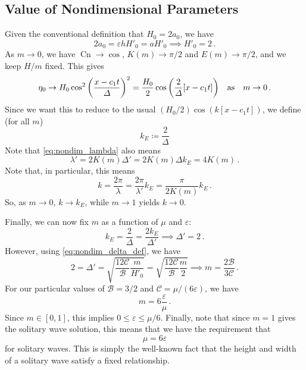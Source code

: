 \documentclass{jfm}
\let\Oldsubsection\subsection
\renewcommand{\subsection}{\FloatBarrier\Oldsubsection}
\DeclareMathOperator{\cn}{Cn}
\renewcommand*{\epsilon}{\varepsilon}
\begin{document}
\subsection{Value of Nondimensional Parameters}
Given the conventional definition that $H_0 = 2 a_0$, we have
\begin{equation}
  2 a_0 = \epsilon h H'_0 = a H'_0 \implies H'_0 = 2 \,.
\end{equation}
As $m \to 0$, we have $\cn \to \cos$, $K(m) \to \pi/2$ and $E(m) \to
\pi/2$, and we keep $H/m$ fixed.
This gives
\begin{equation}
  \eta_0 \to H_0 \cos^2 \pqty{\frac{x-c_1 t}{\Delta}}^2
  = \frac{H_0}{2} \cos \pqty{\frac{2}{\Delta} \bqty{x-c_1 t}}
  \qq{as} m \to 0 \,.
\end{equation}
Since we want this to reduce to the usual $(H_0/2) \cos(k[x-c_1 t])$, we
define (for all $m$)
\begin{equation}
  k_E \coloneqq \frac{2}{\Delta}
\end{equation}
Note that \cref{eq:nondim_lambda} also means
\begin{equation}
  \lambda' = 2 K(m) \Delta' = 2 K(m) \Delta k_E = 4 K(m) \,.
\end{equation}
Note that, in particular, this means
\begin{equation}
  k = \frac{2 \pi}{\lambda} = \frac{2 \pi}{\lambda'} k_E
  = \frac{\pi}{2 K(m)} k_E \,.
\end{equation}
So, as $m \to 0$, $k \to k_E$, while $m \to 1$ yields $k \to 0$.

Finally, we can now fix $m$ as a function of $\mu$ and $\epsilon$:
\begin{equation}
  k_E = \frac{2}{\Delta} = \frac{2 k_E}{\Delta'}
  \implies \Delta' = 2 \,.
\end{equation}
However, using \cref{eq:nondim_delta_def}, we have
\begin{equation}
  2 = \Delta ' = \sqrt{\frac{12 \mathcal{C}}{\mathcal{B}}
    \frac{m}{H'_0}}
  = \sqrt{\frac{12 \mathcal{C}}{\mathcal{B}} \frac{m}{2}}
  \implies m = \frac{2 \mathcal{B}}{3 \mathcal{C}} \,.
\end{equation}
For our particular values of $\mathcal{B} = 3/2$ and $\mathcal{C} =
\mu/(6 \epsilon)$, we have
\begin{equation}
  m = 6 \frac{\epsilon}{\mu} \,.
\end{equation}
Since $m \in [0,1]$, this implies $0 \le \epsilon \le \mu/6$.
Finally, note that since $m = 1$ gives the solitary wave solution, this
means that we have the requirement that
\begin{equation}
  \mu = 6 \epsilon
\end{equation}
for solitary waves.
This is simply the well-known fact that the height and width of a
solitary wave satisfy a fixed relationship.
\end{document}
